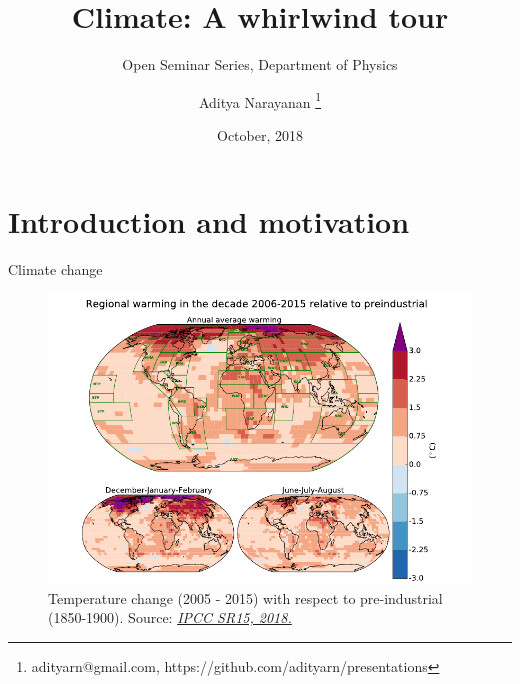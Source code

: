 \documentclass{beamer}
\title{Climate: A whirlwind tour}
\subtitle{\small Open Seminar Series, Department of Physics}
\author{Aditya Narayanan \thanks{adityarn@gmail.com, https://github.com/adityarn/presentations}}
\institute[IITM] %
{
  Department of Ocean Engineering\\
  IIT Madras}
\date{October, 2018}
\begin{document}
\begin{frame}
  \titlepage
\end{frame}


\section{Introduction and motivation}

\begin{frame}{Climate change}
\begin{figure}
\includegraphics[width=\linewidth]{./Images/RegionalWarming_2006_2015}
\caption{\label{fig:RegWarming} Temperature change (2005 - 2015) with respect to pre-industrial (1850-1900). {\tiny Source: \href{http://www.ipcc.ch/report/sr15/}{\textit{IPCC SR15, 2018.}}}}
\end{figure}
\end{frame}
\end{document}
